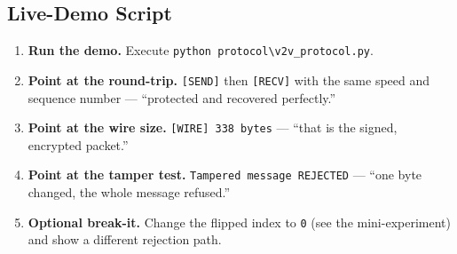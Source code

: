 \documentclass[11pt,a4paper]{article}
\begin{document}
\subsection{Live-Demo Script}
\begin{enumerate}
  \item \textbf{Run the demo.} Execute \texttt{python
        protocol\textbackslash v2v\_protocol.py}.
  \item \textbf{Point at the round-trip.} \texttt{[SEND]} then \texttt{[RECV]}
        with the same speed and sequence number --- ``protected and recovered
        perfectly.''
  \item \textbf{Point at the wire size.} \texttt{[WIRE] 338 bytes} --- ``that is
        the signed, encrypted packet.''
  \item \textbf{Point at the tamper test.} \texttt{Tampered message REJECTED} ---
        ``one byte changed, the whole message refused.''
  \item \textbf{Optional break-it.} Change the flipped index to \texttt{0} (see
        the mini-experiment) and show a different rejection path.
\end{enumerate}
\end{document}
